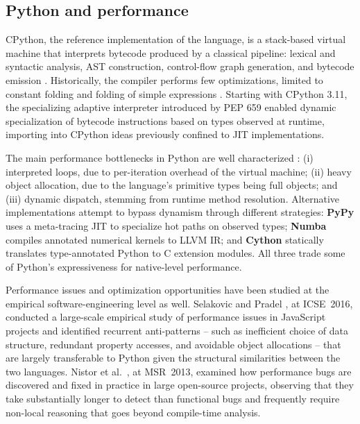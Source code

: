 \documentclass[conference]{IEEEtran}
\begin{document}
\subsection{Python and performance}
CPython, the reference implementation of the language, is a stack-based virtual machine that interprets bytecode produced by a classical pipeline: lexical and syntactic analysis, AST construction, control-flow graph generation, and bytecode emission \cite{DBLP:books/aw/AhoLSU06}. Historically, the compiler performs few optimizations, limited to constant folding and folding of simple expressions \cite{DBLP:books/aw/AhoLSU06}. Starting with CPython 3.11, the specializing adaptive interpreter introduced by PEP 659 \cite{pep659} enabled dynamic specialization of bytecode instructions based on types observed at runtime, importing into CPython ideas previously confined to JIT implementations.

The main performance bottlenecks in Python are well characterized \cite{DBLP:conf/acsc/HolknerH09,DBLP:conf/dls/AkerblomW15}: (i) interpreted loops, due to per-iteration overhead of the virtual machine; (ii) heavy object allocation, due to the language's primitive types being full objects; and (iii) dynamic dispatch, stemming from runtime method resolution. Alternative implementations attempt to bypass dynamism through different strategies: \textbf{PyPy} \cite{DBLP:conf/icooolps/BolzCFR09} uses a meta-tracing JIT to specialize hot paths on observed types; \textbf{Numba} \cite{DBLP:conf/sc/LamPS15} compiles annotated numerical kernels to LLVM IR; and \textbf{Cython} \cite{DBLP:journals/cse/BehnelBCDSS11} statically translates type-annotated Python to C extension modules. All three trade some of Python's expressiveness for native-level performance.

Performance issues and optimization opportunities have been studied at the empirical software-engineering level as well. Selakovic and Pradel \cite{DBLP:conf/icse/SelakovicP16}, at ICSE~2016, conducted a large-scale empirical study of performance issues in JavaScript projects and identified recurrent anti-patterns -- such as inefficient choice of data structure, redundant property accesses, and avoidable object allocations -- that are largely transferable to Python given the structural similarities between the two languages. Nistor et al.~\cite{DBLP:conf/msr/NistorJT13}, at MSR~2013, examined how performance bugs are discovered and fixed in practice in large open-source projects, observing that they take substantially longer to detect than functional bugs and frequently require non-local reasoning that goes beyond compile-time analysis.
\end{document}
